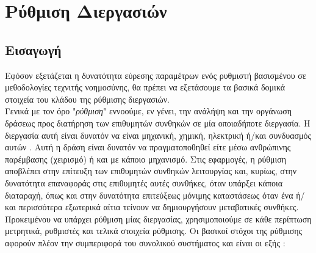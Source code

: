 \documentclass[11pt]{article} %
\numberwithin{equation}{subsection}
\begin{document}
\section{Ρύθμιση Διεργασιών}


\subsection{Εισαγωγή}
Εφόσον εξετάζεται η δυνατότητα εύρεσης παραμέτρων ενός ρυθμιστή βασισμένου σε μεθοδολογίες τεχνιτής νοημοσύνης, θα πρέπει να εξετάσουμε τα βασικά δομικά στοιχεία του κλάδου της ρύθμισης διεργασιών.\\

Γενικά με τον όρο "\textit{ρύθμιση}" εννοούμε, εν γένει, την ανάλήψη και την οργάνωση δράσεως προς διατήρηση των επιθυμητών συνθηκών σε μία οποιαδήποτε διεργασία. Η διεργασία αυτή είναι δυνατόν να είναι μηχανική, χημική, ηλεκτρική ή/και συνδυασμός αυτών \cite{daoutidhs}. Αυτή η δράση είναι δυνατόν να πραγματοποθηθεί είτε μέσω ανθρώπινης παρέμβασης (χειρισμό) ή και με κάποιο μηχανισμό. Στις εφαρμογές, η ρύθμιση αποβλέπει στην επίτευξη των επιθυμητών συνθηκών λειτουργίας και, κυρίως, στην δυνατότητα επαναφοράς στις επιθυμητές αυτές συνθήκες, όταν υπάρξει κάποια διαταραχή, όπως και στην δυνατότητα επιτεύξεως μόνιμης καταστάσεως όταν ένα ή/και περισσότερα εξωτερικά αίτια τείνουν να δημιουργήσουν μεταβατικές συνθήκες. Προκειμένου να υπάρχει ρύθμιση μίας διεργασίας, χρησιμοποιούμε σε κάθε περίπτωση μετρητικά, ρυθμιστές και τελικά στοιχεία ρύθμισης. Οι βασικοί στόχοι της ρύθμισης αφορούν πλέον την συμπεριφορά του συνολικού συστήματος και είναι οι εξής \cite{daoutidhs}:\\
\end{document}
